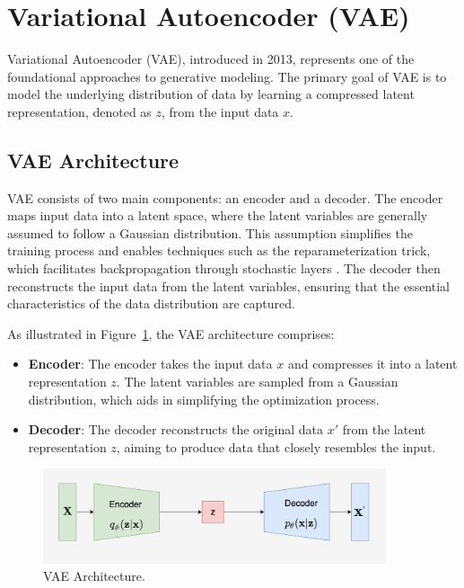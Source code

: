 \section{Variational Autoencoder (VAE)}

Variational Autoencoder (VAE), introduced in 2013, represents one of the foundational approaches to generative modeling. The primary goal of VAE is to model the underlying distribution of data by learning a compressed latent representation, denoted as \(z\), from the input data \(x\).

\subsection{VAE Architecture}
VAE consists of two main components: an encoder and a decoder. The encoder maps input data into a latent space, where the latent variables are generally assumed to follow a Gaussian distribution. This assumption simplifies the training process and enables techniques such as the reparameterization trick, which facilitates backpropagation through stochastic layers \citep{10.1561/2200000056}. The decoder then reconstructs the input data from the latent variables, ensuring that the essential characteristics of the data distribution are captured.

As illustrated in Figure~\ref{fig:VAE_structure}, the VAE architecture comprises:
\begin{itemize}
    \item \textbf{Encoder}: The encoder takes the input data \(x\) and compresses it into a latent representation \(z\). The latent variables are sampled from a Gaussian distribution, which aids in simplifying the optimization process.
    \item \textbf{Decoder}: The decoder reconstructs the original data \(x'\) from the latent representation \(z\), aiming to produce data that closely resembles the input.
\end{itemize}

\begin{figure}[H]
    \centering
    \includegraphics[width=0.9\textwidth]{./Images/VAE_structure.jpg}
    \caption{VAE Architecture.}
    \label{fig:VAE_structure}
\end{figure}

